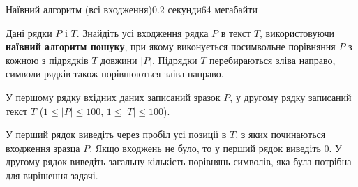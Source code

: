 \begin{problem}{Наївний алгоритм (всі входження)}{}{}{0.2 секунди}{64 мегабайти}

Дані рядки $P$ і $T$. Знайдіть усі входження рядка $P$ в текст $T$, використовуючи {\bf наївний алгоритм пошуку}, 
при якому виконується посимвольне порівняння $P$ з кожною з підрядків $T$ довжини $|P|$.
Підрядки $T$ перебираються зліва направо, символи рядків також порівнюються зліва направо. 

\InputFile
У першому рядку вхідних даних записаний зразок $P$, 
у другому рядку записаний текст $T$ ($1 \le |P| \le 100$, $1 \le |T| \le 100$).


\OutputFile
У перший рядок виведіть через пробіл усі позиції в $T$, з яких починаються входження зразца $P$. 
Якщо входжень не було, то у перший рядок виведіть 0.
У другому рядок виведіть загальну кількість порівнянь символів, яка була потрібна для вирішення задачі. 

\Examples

\begin{example}
%
\end{example}

\end{problem}

